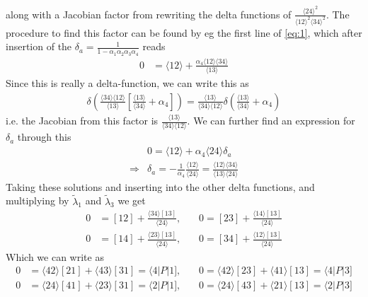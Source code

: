 \documentclass[letter,11pt]{article}
\newcommand{\ab}[1]{\langle #1 \rangle}
\newcommand{\sqb}[1]{[ #1 ]}
\newcommand{\aMs}[3]{\langle #1|#2|#3]}  		%
\begin{document}
along with a Jacobian factor from rewriting the delta functions of $\frac{\ab{24}^2}{\ab{12}^2\ab{34}^2}$. The procedure to find this factor can be found by eg the first line of \eqref{eq:1}, which after insertion of the $\delta_a=\frac{1}{1-\alpha_1 \alpha_2 \alpha_3 \alpha_4}$ reads
\begin{equation}
	\begin{aligned}
	0&=   
\langle 1 2 \rangle + \frac{ \alpha_{4} \langle 12\rangle \ab{34}
}{\ab{13}}
	\end{aligned}
\end{equation}
Since this is really a delta-function, we can write this as
\begin{equation}
	\begin{aligned}
\delta\left(
\frac{\ab{34}\ab{12}}{\ab{13}}\left[\frac{\ab{13}}{\ab{34}}+\alpha_4\right] 
\right)=\frac{\ab{13}}{\ab{34}\ab{12}}\delta\left(
\frac{\ab{13}}{\ab{34}}+\alpha_4
\right)
	\end{aligned}
\end{equation}
i.e. the Jacobian from this factor is $\frac{\ab{13}}{\ab{34}\ab{12}}$.
We can further find an expression for $\delta_a$ through this
\begin{equation}
	\begin{aligned}
		  &0=   
		\langle 1 2 \rangle +  \alpha_{4} \langle 2 4\rangle\delta_a
		\\ 
		\Rightarrow&\delta_a=-\frac{1}{\alpha_4}\frac{\langle 1 2 \rangle}{\langle 24 \rangle}=\frac{\langle 1 2 \rangle \langle 34 \rangle}{ \langle 13 \rangle\langle 24 \rangle}
	\end{aligned}
\end{equation}
Taking these solutions and inserting into the other delta functions, and multiplying by $\tilde\lambda_1$ and $\tilde\lambda_3$ we get
\begin{equation}
	\begin{aligned}
	0&=	\sqb{12}+\frac{\ab{34}\sqb{13}}{\ab{24}}
,	~~~~~~~~
	0=	\sqb{23}+\frac{\ab{14}\sqb{13}}{\ab{24}}
	\\
	0&=	\sqb{14}+\frac{\ab{23}\sqb{13}}{\ab{24}}
,	~~~~~~~~
	0=	\sqb{34}+\frac{\ab{12}\sqb{13}}{\ab{24}}
	\end{aligned}
\end{equation}
Which we can write as
\begin{equation}
	\begin{aligned}
		0&=	\ab{42}\sqb{21}+\ab{43}\sqb{31}=\aMs{4}{P}{1}
		,	~~~~~~~~
		0=	\ab{42}\sqb{23}+\ab{41}\sqb{13}=\aMs{4}{P}{3}
		\\
		0&=	\ab{24}\sqb{41}+\ab{23}\sqb{31}=\aMs{2}{P}{1}
		,	~~~~~~~~
		0=	\ab{24}\sqb{43}+\ab{21}\sqb{13}=\aMs{2}{P}{3}
	\end{aligned}
\end{equation}
\end{document}
